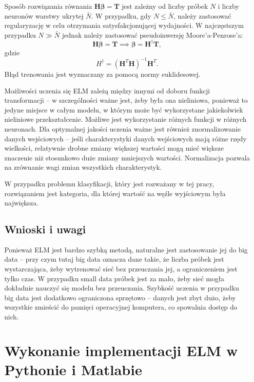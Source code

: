 \documentclass{article}
\begin{document}
Sposób rozwiązania równania $\bm{H}\bm{\beta}=\bm{T}$ jest zależny od liczby próbek $N$ i liczby neuronów warstwy ukrytej $\bar{N}$. W przypadku, gdy $N \leq \bar{N}$, należy zastosować regularyzację w celu otrzymania satysfakcjonującej wydajności. W najczęstszym przypadku $N \gg \bar{N}$ jednak należy zastosować pseudoinwersję Moore'a-Penrose'a:
\begin{equation}
\bm{H}\bm{\beta}=\bm{T} \implies \bm{\beta}=\bm{H}^{\dagger}\bm{T},
\end{equation}
gdzie 
\begin{equation}
{H}^{\dagger} = (\bm{H}^T \bm{H})^{-1}\bm{H}^T.
\end{equation}
Błąd trenowania jest wyznaczany za pomocą normy euklidesowej.

Możliwości uczenia się ELM zależą między innymi od doboru funkcji transformacji -- w szczególności ważne jest, żeby była ona nieliniowa, ponieważ to jedyne miejsce w całym modelu, w którym może być wykorzystane jakiekolwiek nieliniowe przekształcenie. Możliwe jest wykorzystanie różnych funkcji w różnych neuronach. Dla optymalnej jakości uczenia ważne jest również znormalizowanie danych wejściowych -- jeśli charakterystyki danych wejściowych mają różne rzędy wielkości, relatywnie drobne zmiany większej wartości mogą mieć większe znaczenie niż stosunkowo duże zmiany mniejszych wartości. Normalizacja pozwala na zrównanie wagi zmian wszystkich charakterystyk. \par

W przypadku problemu klasyfikacji, który jest rozważany w tej pracy, rozwiązaniem jest kategoria, dla której wartość na węźle wyjściowym była największa. 
\subsection{Wnioski i uwagi}
Ponieważ ELM jest bardzo szybką metodą, naturalne jest zastosowanie jej do big data -- przy czym tutaj big data oznacza dane takie, że liczba próbek jest wystarczająca, żeby wytrenować sieć bez przeuczania jej, a ograniczeniem jest tylko czas. W przypadku small data próbek jest za mało, żeby sieć mogła dokładnie nauczyć się modelu bez przeuczania. Szybkość uczenia w przypadku big data jest dodatkowo ograniczona sprzętowo -- danych jest zbyt dużo, żeby wszystkie zmieścić do pamięci operacyjnej komputera, co spowalnia dostęp do nich.

\clearpage
\section{Wykonanie implementacji ELM w Pythonie i Matlabie}
\end{document}
